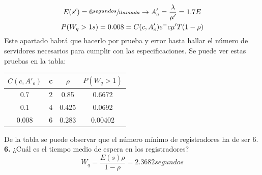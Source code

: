\begin{exercise}[5]
\begin{gather*}
E(s')=6\sfrac{segundos}{llamada}\to A'_o=\frac{\lambda}{\mu '}=1.7E\\
P(W_q>1s)=0.008=C(c,A'_o)e^-c\mu 'T(1-\rho)
\end{gather*}
Este apartado habrá que hacerlo por prueba y error hasta hallar el número de servidores necesarios para cumplir con las especificaciones. Se puede ver estas pruebas en la tabla:\\
\begin{center}
\begin{tabular}{c | c | c | c}
$C(c,A'_o)$ & c & $\rho$ & $P(W_q>1)$ \\\hline
0.7  & 2 & 0.85  & 0.6672 \\
0.1  & 4 & 0.425 & 0.0692 \\
0.008 & 6 & 0.283 & 0.00402
\end{tabular}
\end{center} 
De la tabla se puede observar que el número mínimo de registradores ha de ser 6.\\
\textbf{6.} ¿Cuál es el tiempo medio de espera en los registradores?\\
\[W_q=\frac{E(s)\rho}{1-\rho}=2.3682segundos\]
\end{exercise}
